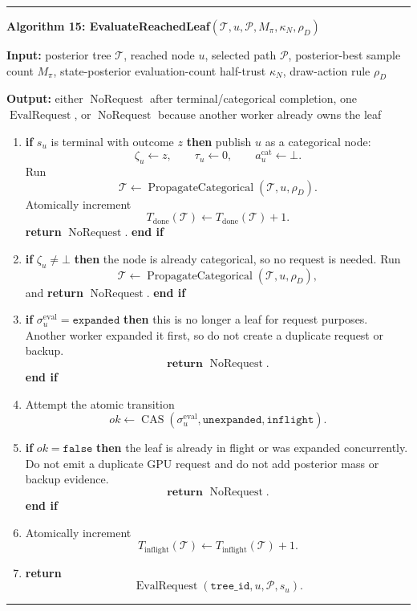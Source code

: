 \documentclass[11pt]{article}
\newcommand{\Tree}{\mathcal{T}}
\newcommand{\Path}{\mathcal{P}}
\newcommand{\NoRequest}{\operatorname{NoRequest}}
\newcommand{\CAS}{\operatorname{CAS}}
\newcommand{\PropagateCategorical}{\operatorname{PropagateCategorical}}
\newenvironment{algorithmblock}[1]
{
  \par\medskip
  \noindent\hrule\par\smallskip
  \noindent\textbf{#1}
  \par\smallskip
}
{
  \par\smallskip\noindent\hrule\par\medskip
}
\newcommand{\Input}{\textbf{Input: }}
\newcommand{\Output}{\textbf{Output: }}
\newcommand{\Return}{\textbf{return }}
\newcommand{\If}{\textbf{if }}
\newcommand{\Then}{\textbf{ then }}
\newcommand{\EndIf}{\textbf{end if}}
\begin{document}
\begin{algorithmblock}{Algorithm 15: EvaluateReachedLeaf\((\Tree,u,\Path,M_\pi,\kappa_N,\rho_D)\)}

\Input posterior tree \(\Tree\), reached node \(u\), selected path \(\Path\), posterior-best sample count \(M_\pi\), state-posterior evaluation-count half-trust \(\kappa_N\), draw-action rule \(\rho_D\)

\Output either \(\NoRequest\) after terminal/categorical completion, one \(\operatorname{EvalRequest}\), or \(\NoRequest\) because another worker already owns the leaf

\begin{enumerate}[leftmargin=2em]
  \item \If \(s_u\) is terminal with outcome \(z\) \Then publish \(u\) as a
  categorical node:
  \[
  \zeta_u\gets z,
  \qquad
  \tau_u\gets 0,
  \qquad
  a_u^{\mathrm{cat}}\gets\bot.
  \]
  Run
  \[
  \Tree\gets\PropagateCategorical(\Tree,u,\rho_D).
  \]
  Atomically increment
  \[
  T_{\mathrm{done}}(\Tree)
  \gets
  T_{\mathrm{done}}(\Tree)+1.
  \]
  \Return \(\NoRequest\). \EndIf

  \item \If \(\zeta_u\ne\bot\) \Then
  the node is already categorical, so no request is needed. Run
  \[
  \Tree\gets\PropagateCategorical(\Tree,u,\rho_D),
  \]
  and \Return \(\NoRequest\). \EndIf

  \item \If \(\sigma^{\mathrm{eval}}_u=\texttt{expanded}\) \Then
  this is no longer a leaf for request purposes. Another worker expanded it
  first, so do not create a duplicate request or backup.
  \[
  \Return \NoRequest.
  \]
  \EndIf

  \item Attempt the atomic transition
  \[
  ok\gets
  \CAS
  \left(
  \sigma^{\mathrm{eval}}_u,
  \texttt{unexpanded},
  \texttt{inflight}
  \right).
  \]

  \item \If \(ok=\texttt{false}\) \Then
  the leaf is already in flight or was expanded concurrently. Do not emit a
  duplicate GPU request and do not add posterior mass or backup evidence.
  \[
  \Return \NoRequest.
  \]
  \EndIf

  \item Atomically increment
  \[
  T_{\mathrm{inflight}}(\Tree)
  \gets
  T_{\mathrm{inflight}}(\Tree)+1.
  \]

  \item \Return
  \[
  \operatorname{EvalRequest}
  \left(
  \texttt{tree\_id},
  u,
  \Path,
  s_u
  \right).
  \]
\end{enumerate}

\end{algorithmblock}
\end{document}
